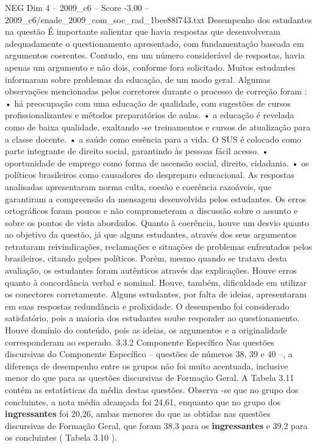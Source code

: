 \begin{textsample}{NEG Dim 4 – 2009\_c6 – Score -3.00 – 2009\_c6/enade\_2009\_com\_soc\_rad\_1bee88f743.txt}
Desempenho dos estudantes na questão É importante salientar que havia respostas que desenvolveram adequadamente o questionamento apresentado, com fundamentação baseada em argumentos coerentes.
Contudo, em um número considerável de respostas, havia apenas um argumento e não dois, conforme fora solicitado.
Muitos estudantes informaram sobre problemas da educação, de um modo geral.
Algumas observações mencionadas pelos corretores durante o processo de correção foram : • há preocupação com uma educação de qualidade, com sugestões de cursos profissionalizantes e métodos preparatórios de aulas. • a educação é revelada como de baixa qualidade, exaltando -se treinamentos e cursos de atualização para a classe docente. • a saúde como essência para a vida.
O SUS é colocado como parte integrante de direito social, garantindo às pessoas fácil acesso. • oportunidade de emprego como forma de ascensão social, direito, cidadania. • os políticos brasileiros como causadores do despreparo educacional.
As respostas analisadas apresentaram norma culta, coesão e coerência razoáveis, que garantiram a compreensão da mensagem desenvolvida pelos estudantes.
Os erros ortográficos foram poucos e não comprometeram a discussão sobre o assunto e sobre os pontos de vista abordados.
Quanto à coerência, houve um desvio quanto ao objetivo da questão, já que alguns estudantes, através dos seus argumentos retrataram reivindicações, reclamações e situações de problemas enfrentados pelos brasileiros, citando golpes políticos.
Porém, mesmo quando se tratava desta avaliação, os estudantes foram autênticos através das explicações.
Houve erros quanto à concordância verbal e nominal.
Houve, também, dificuldade em utilizar os conectores corretamente.
Alguns estudantes, por falta de ideias, apresentaram em suas respostas redundância e prolixidade.
O desempenho foi considerado satisfatório, pois a maioria dos estudantes soube responder ao questionamento.
Houve domínio do conteúdo, pois as ideias, os argumentos e a originalidade corresponderam ao esperado. 3.3.2 Componente Específico Nas questões discursivas do Componente Específico – questões de números 38, 39 e 40 –, a diferença de desempenho entre os grupos não foi muito acentuada, inclusive menor do que para as questões discursivas de Formação Geral.
A Tabela 3.11 contém as estatísticas da média destas questões.
Observa -se que no grupo dos concluintes, a nota média alcançada foi 24,61, enquanto que no grupo dos \textbf{ingressantes} foi 20,26, ambas menores do que as obtidas nas questões discursivas de Formação Geral, que foram 38,3 para os \textbf{ingressantes} e 39,2 para os concluintes ( Tabela 3.10 ).

\end{textsample}
